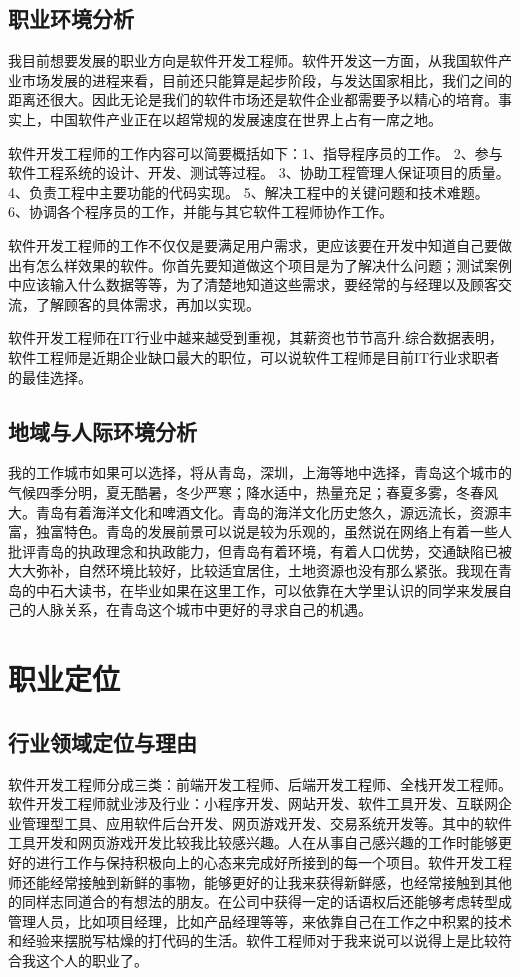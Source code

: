 \documentclass{article}
\begin{document}
\subsection{职业环境分析}
我目前想要发展的职业方向是软件开发工程师。软件开发这一方面，从我国软件产业市场发展的进程来看，目前还只能算是起步阶段，与发达国家相比，我们之间的距离还很大。因此无论是我们的软件市场还是软件企业都需要予以精心的培育。事实上，中国软件产业正在以超常规的发展速度在世界上占有一席之地。\par
软件开发工程师的工作内容可以简要概括如下：1、指导程序员的工作。
2、参与软件工程系统的设计、开发、测试等过程。
3、协助工程管理人保证项目的质量。
4、负责工程中主要功能的代码实现。
5、解决工程中的关键问题和技术难题。
6、协调各个程序员的工作，并能与其它软件工程师协作工作。\par
软件开发工程师的工作不仅仅是要满足用户需求，更应该要在开发中知道自己要做出有怎么样效果的软件。你首先要知道做这个项目是为了解决什么问题；测试案例中应该输入什么数据等等，为了清楚地知道这些需求，要经常的与经理以及顾客交流，了解顾客的具体需求，再加以实现。\par
软件开发工程师在IT行业中越来越受到重视，其薪资也节节高升.综合数据表明，软件工程师是近期企业缺口最大的职位，可以说软件工程师是目前IT行业求职者的最佳选择。

\subsection{地域与人际环境分析}
我的工作城市如果可以选择，将从青岛，深圳，上海等地中选择，青岛这个城市的气候四季分明，夏无酷暑，冬少严寒；降水适中，热量充足；春夏多雾，冬春风大。青岛有着海洋文化和啤酒文化。青岛的海洋文化历史悠久，源远流长，资源丰富，独富特色。青岛的发展前景可以说是较为乐观的，虽然说在网络上有着一些人批评青岛的执政理念和执政能力，但青岛有着环境，有着人口优势，交通缺陷已被大大弥补，自然环境比较好，比较适宜居住，土地资源也没有那么紧张。我现在青岛的中石大读书，在毕业如果在这里工作，可以依靠在大学里认识的同学来发展自己的人脉关系，在青岛这个城市中更好的寻求自己的机遇。
\par 
\section{职业定位}
\subsection{行业领域定位与理由}
软件开发工程师分成三类：前端开发工程师、后端开发工程师、全栈开发工程师。软件开发工程师就业涉及行业：小程序开发、网站开发、软件工具开发、互联网企业管理型工具、应用软件后台开发、网页游戏开发、交易系统开发等。其中的软件工具开发和网页游戏开发比较我比较感兴趣。人在从事自己感兴趣的工作时能够更好的进行工作与保持积极向上的心态来完成好所接到的每一个项目。软件开发工程师还能经常接触到新鲜的事物，能够更好的让我来获得新鲜感，也经常接触到其他的同样志同道合的有想法的朋友。在公司中获得一定的话语权后还能够考虑转型成管理人员，比如项目经理，比如产品经理等等，来依靠自己在工作之中积累的技术和经验来摆脱写枯燥的打代码的生活。软件工程师对于我来说可以说得上是比较符合我这个人的职业了。
\par
\end{document}
